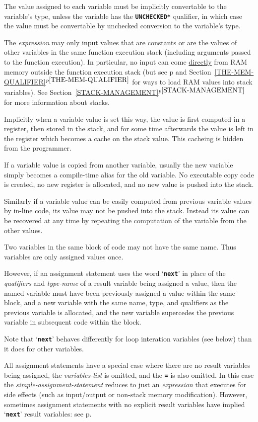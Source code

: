 \documentclass[12pt]{article}
\newcommand{\TT}[1]{{\tt \bfseries #1}}
\newcommand{\itemref}[1]{\ref{#1}$^{p\pageref{#1}}$}
\newcommand{\pagref}[1]{p\pageref{#1}}
\begin{document}
The value assigned to each variable
must be implicitly convertable to the variable's type, unless
the variable has the \TT{*UNCHECKED*} qualifier, in which case
the value must be convertable by unchecked conversion to the
variable's type.

The {\em expression} may only input values that are constants or are
the values of other variables in the same function execution
stack (including
arguments passed to the function execution).  In particular,
no input can come \underline{directly}
from RAM memory outside the function execution stack
(but see \pagref{MEM} and Section~\itemref{THE-MEM-QUALIFIER}
for ways to load RAM values into stack variables).
See Section~\itemref{STACK-MANAGEMENT} for more information about stacks.

Implicitly when a variable value is set this way, the value is first
computed in a register, then stored in the stack, and for some time
afterwards the value is left in the register which becomes a cache
on the stack value.  This cacheing is hidden from the programmer.

If a variable value is copied from another variable, usually the
new variable simply becomes a compile-time alias for the old variable.
No executable copy code is created, no new register is allocated, and no new
value is pushed into the stack.

Similarly if a variable value can be easily computed from previous variable
values by in-line code, 
its value may not be pushed into the stack.  Instead its
value can be recovered at any time by repeating the computation
of the variable from the other values.

Two variables in the same block of code may not have the same
name.  Thus variables are only assigned values once.

However, if an assignment statement uses the word `\TT{next}' in
place of the {\em qualifiers} and {\em type-name}
of a result variable being assigned a value, then the named variable must
have been previously assigned a value within the same block,
and a new variable with the same
name, type, and qualifiers as the previous variable is allocated,
and the new variable supercedes the previous variable in subsequent code within
the block.

Note that `\TT{next}' behaves differently for loop interation
variables (see below) than it does for other variables.

All assignment statements have a special case where there are
no result variables being assigned, the {\em variables-list} is omitted,
and the \TT{=} is also omitted.  In this case the
{\em simple-assignment-statement} reduces to just an {\em expression}
that executes for side effects (such as
input/output or non-stack memory modification).
However, sometimes assignment statements with no explicit
result variables have implied `\TT{next}' result variables:
see \pagref{IMPLIED-NEXT-VARIABLES}.
\end{document}
